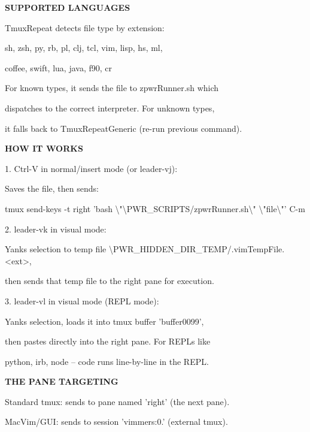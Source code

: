 \documentclass[11pt,a4paper,twoside]{book}
\begin{document}
\vspace{12pt}
{\bfseries\color{neonyellow} SUPPORTED LANGUAGES}\vspace{4pt}

TmuxRepeat detects file type by extension:

sh, zsh, py, rb, pl, clj, tcl, vim, lisp, hs, ml,

coffee, swift, lua, java, f90, cr

For known types, it sends the file to zpwrRunner.sh which

dispatches to the correct interpreter. For unknown types,

it falls back to TmuxRepeatGeneric (re-run previous command).


\vspace{12pt}
{\bfseries\color{neonyellow} HOW IT WORKS}\vspace{4pt}

\begin{codebox}
1. Ctrl-V in normal/insert mode (or leader-vj):\\
\end{codebox}

Saves the file, then sends:

\begin{codebox}
tmux send-keys -t right 'bash \textbackslash{}"\textbackslash{}PWR\_SCRIPTS/zpwrRunner.sh\textbackslash{}" \textbackslash{}"file\textbackslash{}"' C-m\\
\end{codebox}

2. leader-vk in visual mode:

Yanks selection to temp file \textbackslash{}PWR\_HIDDEN\_DIR\_TEMP/.vimTempFile.<ext>,

then sends that temp file to the right pane for execution.

3. leader-vl in visual mode (REPL mode):

Yanks selection, loads it into tmux buffer 'buffer0099',

then pastes directly into the right pane. For REPLs like

python, irb, node -- code runs line-by-line in the REPL.


\vspace{12pt}
{\bfseries\color{neonyellow} THE PANE TARGETING}\vspace{4pt}

Standard tmux: sends to pane named 'right' (the next pane).

MacVim/GUI: sends to session 'vimmers:0.' (external tmux).
\end{document}

